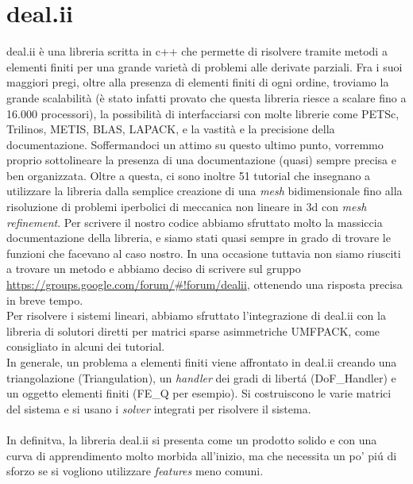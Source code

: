 \documentclass[a4paper,10pt]{report}
\theoremstyle{plain}
\theoremstyle{definition}
\theoremstyle{remark}
\begin{document}
\section{\textsf{deal.ii}}
\textsf{deal.ii} \`e una libreria scritta in c++ che permette di risolvere tramite metodi a elementi finiti per una grande variet\`a di problemi alle derivate parziali. Fra i suoi maggiori pregi, oltre alla presenza di elementi finiti di ogni ordine, troviamo la grande scalabilit\`a (\`e stato infatti provato che questa libreria riesce a scalare fino a 16.000 processori), la possibilit\`a di interfacciarsi con molte librerie come \textsf{PETSc}, \textsf{Trilinos}, \textsf{METIS}, \textsf{BLAS}, \textsf{LAPACK}, e la vastit\`a e la precisione della documentazione. Soffermandoci un attimo su questo ultimo punto, vorremmo proprio sottolineare la presenza di una documentazione (quasi) sempre precisa e ben organizzata. Oltre a questa, ci sono inoltre 51 tutorial che insegnano a utilizzare la libreria dalla semplice creazione di una \emph{mesh} bidimensionale fino alla risoluzione di problemi iperbolici di meccanica non lineare in 3d con \emph{mesh refinement}. Per scrivere il nostro codice abbiamo sfruttato molto la massiccia documentazione della libreria, e siamo stati quasi sempre in grado di trovare le funzioni che facevano al caso nostro. In una occasione tuttavia non siamo riusciti a trovare un metodo e abbiamo deciso di scrivere sul gruppo \url{https://groups.google.com/forum/#!forum/dealii}, ottenendo una risposta precisa in breve tempo.\\
Per risolvere i sistemi lineari, abbiamo sfruttato l'integrazione di \textsf{deal.ii} con la libreria di solutori diretti per matrici sparse asimmetriche UMFPACK, come consigliato in alcuni dei tutorial.\\
In generale, un problema a elementi finiti viene affrontato in \textsf{deal.ii} creando una triangolazione (\textsf{Triangulation}), un \emph{handler} dei gradi di libert\'a (\textsf{DoF\_Handler}) e un oggetto elementi finiti (\textsf{FE\_Q} per esempio). Si costruiscono le varie matrici del sistema e si usano i \emph{solver} integrati per risolvere il sistema.
\\\\
In definitva, la libreria deal.ii si presenta come un prodotto solido e con una curva di apprendimento molto morbida all'inizio, ma che necessita un po' pi\'u di sforzo se si vogliono utilizzare \emph{features} meno comuni.
\end{document}
